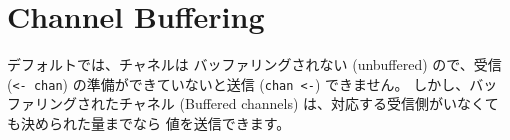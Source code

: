 \section{Channel Buffering}

デフォルトでは、チャネルは バッファリングされない (unbuffered) ので、受信 (\texttt{<- chan}) の準備ができていないと送信 (\texttt{chan <-}) できません。 しかし、バッファリングされたチャネル (Buffered channels) は、対応する受信側がいなくても決められた量までなら 値を送信できます。




